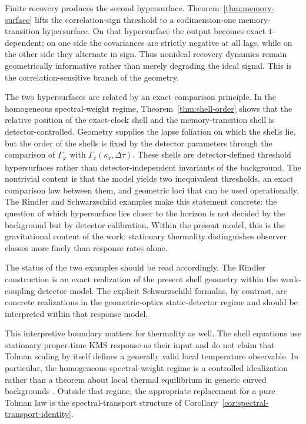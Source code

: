 Finite recovery produces the second hypersurface. Theorem~\ref{thm:memory-surface} lifts the correlation-sign threshold to a codimension-one memory-transition hypersurface. On that hypersurface the output becomes exact $1$-dependent; on one side the covariances are strictly negative at all lags, while on the other side they alternate in sign. Thus nonideal recovery dynamics remain geometrically informative rather than merely degrading the ideal signal. This is the correlation-sensitive branch of the geometry.

The two hypersurfaces are related by an exact comparison principle. In the homogeneous spectral-weight regime, Theorem~\ref{thm:shell-order} shows that the relative position of the exact-clock shell and the memory-transition shell is detector-controlled. Geometry supplies the lapse foliation on which the shells lie, but the order of the shells is fixed by the detector parameters through the comparison of $\Gamma_\varphi$ with $\Gamma_c(\kappa_{\mathrm r},\Delta\tau)$. These shells are detector-defined threshold hypersurfaces rather than detector-independent invariants of the background. The nontrivial content is that the model yields two inequivalent thresholds, an exact comparison law between them, and geometric loci that can be used operationally. The Rindler and Schwarzschild examples make this statement concrete: the question of which hypersurface lies closer to the horizon is not decided by the background but by detector calibration. Within the present model, this is the gravitational content of the work: stationary thermality distinguishes observer classes more finely than response rates alone.

The status of the two examples should be read accordingly. The Rindler construction is an exact realization of the present shell geometry within the weak-coupling detector model. The explicit Schwarzschild formulas, by contrast, are concrete realizations in the geometric-optics static-detector regime and should be interpreted within that response model.

This interpretive boundary matters for thermality as well. The shell equations use stationary proper-time KMS response as their input and do not claim that Tolman scaling by itself defines a generally valid local temperature observable. In particular, the homogeneous spectral-weight regime is a controlled idealization rather than a theorem about local thermal equilibrium in generic curved backgrounds \cite{Solveen2012,BuchholzSolveen2013,GranseePinamontiVerch2017}. Outside that regime, the appropriate replacement for a pure Tolman law is the spectral-transport structure of Corollary~\ref{cor:spectral-transport-identity}.

